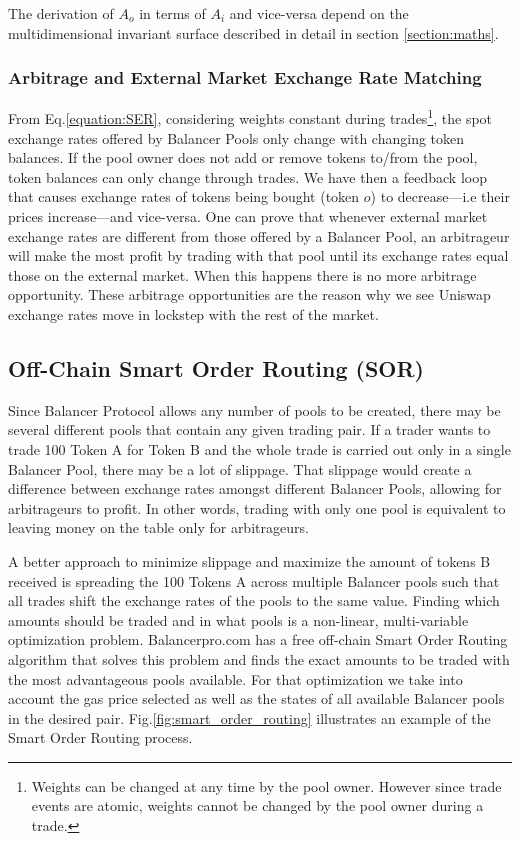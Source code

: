 \documentclass[11pt]{amsart}
\begin{document}
The derivation of $A_{o}$ in terms of $A_{i}$ and vice-versa depend on the multidimensional invariant surface described in detail in section \ref{section:maths}.

\subsubsection{Arbitrage and External Market Exchange Rate Matching}
From Eq.\ref{equation:SER}, considering weights constant during trades\footnote{Weights can be changed at any time by the pool owner. However since trade events are atomic, weights cannot be changed by the pool owner during a trade.}, the spot exchange rates offered by Balancer Pools only change with changing token balances. If the pool owner does not add or remove tokens to/from the pool, token balances can only change through trades. We have then a feedback loop that causes exchange rates of tokens being bought (token $o$) to decrease---i.e their prices increase---and vice-versa. One can prove that whenever external market exchange rates are different from those offered by a Balancer Pool, an arbitrageur will make the most profit by trading with that pool until its exchange rates equal those on the external market. When this happens there is no more arbitrage opportunity. These arbitrage opportunities are the reason why we see Uniswap exchange rates move in lockstep with the rest of the market.

\subsection{Off-Chain Smart Order Routing (SOR)}
Since Balancer Protocol allows any number of pools to be created, there may be several different pools that contain any given trading pair. If a trader wants to trade 100 Token A for Token B and the whole trade is carried out only in a single Balancer Pool, there may be a lot of slippage. That slippage would create a difference between exchange rates amongst different Balancer Pools, allowing for arbitrageurs to profit. In other words, trading with only one pool is equivalent to leaving money on the table only for arbitrageurs.

A better approach to minimize slippage and maximize the amount of tokens B received is spreading the 100 Tokens A across multiple Balancer pools such that all trades shift the exchange rates of the pools to the same value. Finding which amounts should be traded and in what pools is a non-linear, multi-variable optimization problem. Balancerpro.com has a free off-chain Smart Order Routing algorithm that solves this problem and finds the exact amounts to be traded with the most advantageous pools available. For that optimization we take into account the gas price selected as well as the states of all available Balancer pools in the desired pair. Fig.\ref{fig:smart_order_routing} illustrates an example of the Smart Order Routing process.
\end{document}
